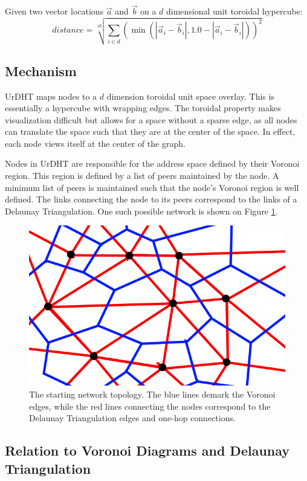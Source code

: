 \documentclass[11pt]{IEEEtran} %
\begin{document}
Given two vector locations $\vec{a}$ and $\vec{b}$ on a  $d$ dimensional unit toroidal hypercube:
\[ distance = \sqrt[|d|]{\sum\limits_{i\in d} (\min(|\vec{a}_i-\vec{b}_i|,1.0-|\vec{a}_i-\vec{b}_i|))^2}\]

\subsection{Mechanism}
UrDHT maps nodes to a $d$ dimension toroidal unit space overlay. This is essentially a hypercube with wrapping edges. The toroidal property makes visualization difficult but allows for a space without a sparse edge, as all nodes can translate the space such that they are at the center of the space.  In effect, each node views itself at the center of the graph.

Nodes in UrDHT are responsible for the address space defined by their Voronoi region. This region is defined by a list of peers maintained by the node. A minimum list of peers is maintained such that the node's Voronoi region is well defined. The links connecting the node to its peers correspond to the links of a Delaunay Triangulation.  One such possible network is shown on Figure \ref{fig:churninit}.


\begin{figure}
    \includegraphics[width=\linewidth]{voronoi-churn2}
    \caption{The starting network topology.  The blue lines demark the Voronoi edges, while the red lines connecting the nodes correspond to the Delaunay Triangulation edges and one-hop connections.}
    \label{fig:churninit}
\end{figure}

\subsection{Relation to Voronoi Diagrams and Delaunay Triangulation}
\end{document}
